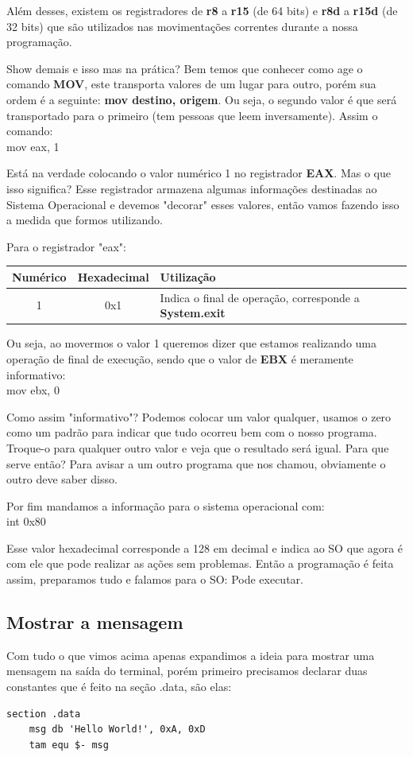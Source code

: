 Além desses, existem os registradores de \textbf{r8} a \textbf{r15} (de 64 bits) e \textbf{r8d} a \textbf{r15d} (de 32 bits) que são utilizados nas movimentações correntes durante a nossa programação.

Show demais e isso mas na prática? Bem temos que conhecer como age o comando \textbf{MOV}, este transporta valores de um lugar para outro, porém sua ordem é a seguinte: \textbf{mov destino, origem}. Ou seja, o segundo valor é que será transportado para o primeiro (tem pessoas que leem inversamente). Assim o comando: \\
{\ttfamily mov eax, 1}

Está na verdade colocando o valor numérico 1 no registrador \textbf{EAX}. Mas o que isso significa? Esse registrador armazena algumas informações destinadas ao Sistema Operacional e devemos "decorar" esses valores, então vamos fazendo isso a medida que formos utilizando.

Para o registrador "eax":
\begin{table}[H]
	\centering 
	\begin{tabular}{c | c | l }
		\textbf{Numérico} & \textbf{Hexadecimal} & \textbf{Utilização} \\ \hline 
		1 & 0x1 & Indica o final de operação, corresponde a \textbf{System.exit}
	\end{tabular}
\end{table}

Ou seja, ao movermos o valor 1 queremos dizer que estamos realizando uma operação de final de execução, sendo que o valor de \textbf{EBX} é meramente informativo: \\
{\ttfamily mov ebx, 0}

Como assim "informativo"? Podemos colocar um valor qualquer, usamos o zero como um padrão para indicar que tudo ocorreu bem com o nosso programa. Troque-o para qualquer outro valor e veja que o resultado será igual. Para que serve então? Para avisar a um outro programa que nos chamou, obviamente o outro deve saber disso.

Por fim mandamos a informação para o sistema operacional com: \\
{\ttfamily int 0x80}

Esse valor hexadecimal corresponde a 128 em decimal e indica ao SO que agora é com ele que pode realizar as ações sem problemas. Então a programação é feita assim, preparamos tudo e falamos para o SO: Pode executar.

\subsection{Mostrar a mensagem}
Com tudo o que vimos acima apenas expandimos a ideia para mostrar uma mensagem na saída do terminal, porém primeiro precisamos declarar duas constantes que é feito na seção .data, são elas: \\
\begin{lstlisting}[]
section .data
	msg db 'Hello World!', 0xA, 0xD
	tam equ $- msg
\end{lstlisting}

